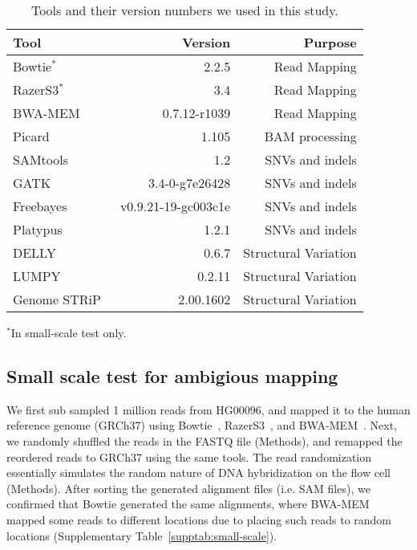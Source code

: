 \documentclass[10pt,a4paper]{article}
\begin{document}
\begin{table}[htb]
\caption{Tools and their version numbers we used in this study.}
\begin{center}
\begin{tabular}{|l|r|r|}
\hline
{\bf Tool} & {\bf Version} & {\bf Purpose}\\
\hline
Bowtie$^*$~\cite{Langmead2009} & 2.2.5 & Read Mapping \\
RazerS3$^*$~\cite{Weese2012} & 3.4 & Read Mapping\\
BWA-MEM~\cite{Li2013} & 0.7.12-r1039 & Read Mapping\\
Picard~\cite{picard} & 1.105 & BAM processing\\
SAMtools~~\cite{Li2009b} & 1.2 & SNVs and indels\\
GATK~\cite{DePristo2011} & 3.4-0-g7e26428 & SNVs and indels\\
Freebayes~\cite{Garrison2012} & v0.9.21-19-gc003c1e & SNVs and indels\\
Platypus~\cite{Rimmer2014} & 1.2.1 & SNVs and indels\\
DELLY~\cite{Rausch2012} & 0.6.7 & Structural Variation\\
LUMPY~\cite{Layer2014} & 0.2.11 & Structural Variation\\
Genome STRiP~\cite{Handsaker2011,Handsaker2015} & 2.00.1602 & Structural Variation\\
\hline
\end{tabular}
\end{center}
    {\footnotesize $^*$In small-scale test only.}

\label{tab:tools}
\end{table}

\subsection*{Small scale test for ambigious mapping}
We first sub sampled 1 million reads from HG00096, and mapped it to the human reference genome (GRCh37) using Bowtie~\cite{Langmead2009}, RazerS3~\cite{Weese2012}, %
and BWA-MEM~\cite{Li2009a,Li2013}.
Next, we randomly shuffled the reads in the FASTQ file (Methods), and remapped the reordered reads to GRCh37 using the same tools. The read randomization essentially simulates the random nature of DNA hybridization on the flow cell (Methods).
After sorting the generated alignment files (i.e. SAM files), we confirmed that %
Bowtie generated the same alignments,
where BWA-MEM mapped some reads to different locations due to placing 
such reads to random locations (Supplementary Table~\ref{supptab:small-scale}).
\end{document}
